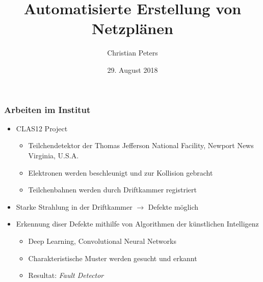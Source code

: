 \documentclass[ngerman, t]{beamer}
\title{Automatisierte Erstellung von Netzpl\"anen}
\author{Christian Peters}
\institute{Institut f\"ur Kernphysik}
\date{29. August 2018}
\begin{document}
\maketitle

\begin{frame}
  \frametitle{Arbeiten im Institut}
  \begin{itemize}
    \item CLAS12 Project
      \begin{itemize}
        \item Teilchendetektor der Thomas Jefferson National Facility,
          Newport News Virginia, U.S.A.
        \item Elektronen werden beschleunigt und zur Kollision
          gebracht
        \item Teilchenbahnen werden durch Driftkammer registriert
      \end{itemize}
    \item Starke Strahlung in der Driftkammer \(\rightarrow\) Defekte
      m\"oglich
    \item Erkennung diser Defekte mithilfe von Algorithmen der
      k\"unstlichen Intelligenz
      \begin{itemize}
        \item Deep Learning, Convolutional Neural Networks
        \item Charakteristische Muster werden gesucht und erkannt
        \item Resultat: \textit{Fault Detector}
      \end{itemize}
  \end{itemize}
\end{frame}
\end{document}
